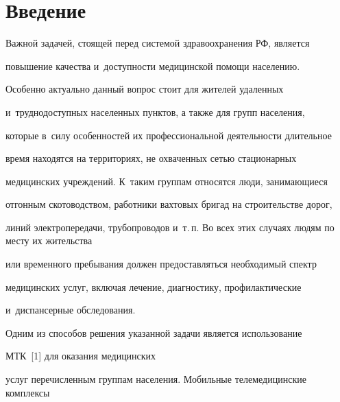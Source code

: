 







      \thispagestyle{headings}


      










\section{Введение}





  Важной задачей, стоящей перед системой здравоохранения РФ, является 


повышение качества и~доступности медицинской помощи населению. 


Особенно актуально данный вопрос стоит для жителей удаленных 


и~труднодоступных населенных пунктов, а также для групп населения, 


которые в~силу особенностей их профессиональной деятельности длительное 


время находятся на территориях, не охваченных сетью стационарных 


медицинских учреждений. К~таким группам относятся люди, занимающиеся 


отгонным скотоводством, работники вахтовых бригад на строительстве дорог, 


линий электропередачи, трубопроводов и~т.\,п. Во всех этих случаях людям по месту их жительства 


или временного пребывания должен предоставляться необходимый спектр 


медицинских услуг, включая лечение, диагностику, профилактические 


и~диспансерные обследования.


  


  Одним из способов решения указанной задачи является использование 


МТК~[1] для оказания медицинских 


услуг перечисленным группам населения. Мобильные телемедицинские комплексы 


